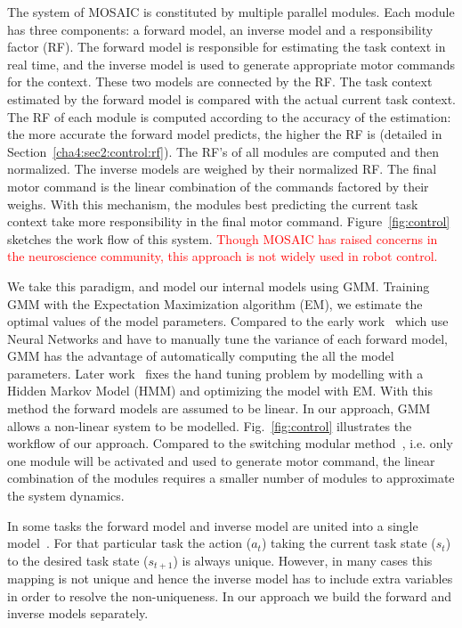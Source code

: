 The system of MOSAIC is constituted by multiple parallel modules. Each module has three components: a forward model, an inverse model and a responsibility factor (RF). The forward model is responsible for estimating the task context in real time, and the inverse model is used to generate appropriate motor commands for the context. These two models are connected by the RF. The task context estimated by the forward model is compared with the actual current task context.
The RF of each module is computed according to the accuracy of the estimation: the more accurate the forward model predicts, the higher the RF is (detailed in Section~\ref{cha4:sec2:control:rf}). The RF's of all modules are computed and then normalized.
The inverse models are weighed by their normalized RF. The final motor command is the linear combination of the commands factored by their weighs. With this mechanism, the modules best predicting the current task context take more responsibility in the final motor command. Figure~\ref{fig:control} sketches the work flow of this system. \textcolor{red}{Though MOSAIC has raised concerns in the neuroscience community, this approach is not widely used in robot control.}

We take this paradigm, and model our internal models using GMM. Training GMM with the Expectation Maximization algorithm (EM), we estimate the optimal values of the model parameters. Compared to the early work~\cite{wolpert1998multiple} which use Neural Networks and have to manually tune the variance of each forward model, GMM has the advantage of automatically computing the all the model parameters. Later work~\cite{haruno2001mosaic} fixes the hand tuning problem by modelling with a Hidden Markov Model (HMM) and optimizing the model with EM. With this method the forward models are assumed to be linear. In our approach, GMM allows a non-linear system to be modelled. Fig.~\ref{fig:control} illustrates the workflow of our approach. Compared to the switching modular method~\cite{narendra1997adaptive}, i.e. only one module will be activated and used to generate motor command, the linear combination of the modules requires a smaller number of modules to approximate the system dynamics.

In some tasks the forward model and inverse model are united into a single model~\cite{petkos2006learning}. For that particular task the action ($a_t$) taking the current task state ($s_t$) to the desired task state ($s_{t+1}$) is always unique. However, in many cases this mapping is not unique and hence the inverse model has to include extra variables in order to resolve the non-uniqueness. In our approach we build the forward and inverse models separately.

